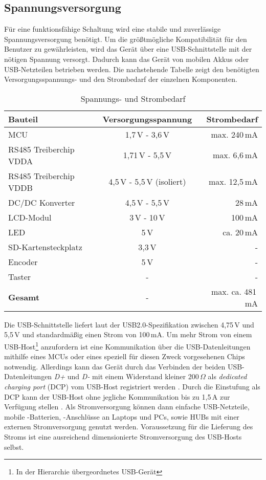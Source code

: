 
\subsection{Spannungsversorgung}
Für eine funktionsfähige Schaltung wird eine stabile und zuverlässige Spannungsversorgung benötigt. Um die größtmögliche Kompatibilität für den Benutzer zu gewährleisten, wird das Gerät über eine USB-Schnittstelle mit der nötigen Spannung versorgt. Dadurch kann das Gerät von mobilen Akkus oder USB-Netzteilen betrieben werden. Die nachstehende Tabelle zeigt den benötigten Versorgungsspannungs- und den Strombedarf der einzelnen Komponenten. 
\begin{table}[h]
	\begin{center}
		\caption{Spannungs- und Strombedarf}
		\begin{tabular}{l | c | r }
			\textbf{Bauteil} & \textbf{Versorgungsspannung} & \textbf{Strombedarf}\\
			\hline
			MCU & 1,7\,V - 3,6\,V & max. 240\,mA\\
			RS485 Treiberchip VDDA & 1,71\,V - 5,5\,V & max. 6,6\,mA\\
			RS485 Treiberchip VDDB & 4,5\,V - 5,5\,V (isoliert)& max. 12,5\,mA\\
			DC/DC Konverter & 4,5\,V - 5,5\,V & 28\,mA\\
			LCD-Modul & 3\,V - 10\,V & 100\,mA\\
			LED & 5\,V & ca. 20\,mA\\
			SD-Kartensteckplatz & 3,3\,V & -\\
			Encoder & 5\,V & -\\
			Taster & - & -\\
			\hline
			\textbf{Gesamt} & - & max. ca. 481\,mA
		\end{tabular}
	\label{tab:VDD+IDD}
	\end{center}
\end{table}
Die USB-Schnittstelle liefert laut der USB2.0-Spezifikation zwischen 4,75\,V und 5,5\,V \cite[S. 283]{USB-PD} und standardmäßig einen Strom von 100\,mA. Um mehr Strom von einem USB-Host\footnote{In der Hierarchie übergeordnetes USB-Gerät} anzufordern ist eine Kommunikation über die USB-Datenleitungen mithilfe eines MCUs oder eines speziell für diesen Zweck vorgesehenen Chips notwendig. Allerdings kann das Gerät durch das Verbinden der beiden USB-Datenleitungen \textit{D+} und \textit{D-} mit einem Widerstand kleiner 200\,$\Omega$ als \textit{dedicated charging port} (DCP) vom USB-Host registriert werden \cite[S. 41]{USB-Battery}. Durch die Einstufung als DCP kann der USB-Host ohne jegliche Kommunikation bis zu 1,5\,A zur Verfügung stellen \cite[S. 45]{USB-Battery}. Als Stromversorgung können dann einfache USB-Netzteile, mobile -Batterien, -Anschlüsse an Laptops und PCs, sowie HUBs mit einer externen Stromversorgung genutzt werden. Voraussetzung für die Lieferung des Stroms ist eine ausreichend dimensionierte Stromversorgung des USB-Hosts selbst. 
